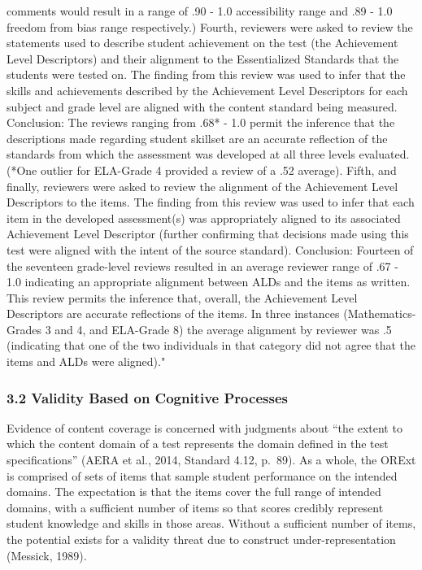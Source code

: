 \documentclass[]{article}
\begin{document}
comments would result in a range of .90 - 1.0 accessibility range and
.89 - 1.0 freedom from bias range respectively.) Fourth, reviewers were
asked to review the statements used to describe student achievement on
the test (the Achievement Level Descriptors) and their alignment to the
Essentialized Standards that the students were tested on. The finding
from this review was used to infer that the skills and achievements
described by the Achievement Level Descriptors for each subject and
grade level are aligned with the content standard being measured.
Conclusion: The reviews ranging from .68* - 1.0 permit the inference
that the descriptions made regarding student skillset are an accurate
reflection of the standards from which the assessment was developed at
all three levels evaluated. (*One outlier for ELA-Grade 4 provided a
review of a .52 average). Fifth, and finally, reviewers were asked to
review the alignment of the Achievement Level Descriptors to the items.
The finding from this review was used to infer that each item in the
developed assessment(s) was appropriately aligned to its associated
Achievement Level Descriptor (further confirming that decisions made
using this test were aligned with the intent of the source standard).
Conclusion: Fourteen of the seventeen grade-level reviews resulted in an
average reviewer range of .67 - 1.0 indicating an appropriate alignment
between ALDs and the items as written. This review permits the inference
that, overall, the Achievement Level Descriptors are accurate
reflections of the items. In three instances (Mathematics-Grades 3 and
4, and ELA-Grade 8) the average alignment by reviewer was .5 (indicating
that one of the two individuals in that category did not agree that the
items and ALDs were aligned)."

\hypertarget{validity-based-on-cognitive-processes}{%
\subsubsection{3.2 Validity Based on Cognitive
Processes}\label{validity-based-on-cognitive-processes}}

Evidence of content coverage is concerned with judgments about ``the
extent to which the content domain of a test represents the domain
defined in the test specifications'' (AERA et al., 2014, Standard 4.12,
p.~89). As a whole, the ORExt is comprised of sets of items that sample
student performance on the intended domains. The expectation is that the
items cover the full range of intended domains, with a sufficient number
of items so that scores credibly represent student knowledge and skills
in those areas. Without a sufficient number of items, the potential
exists for a validity threat due to construct under-representation
(Messick, 1989).
\end{document}
